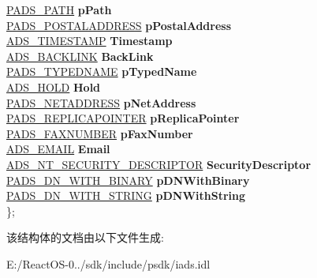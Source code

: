 \begin{DoxyCompactItemize}
\begin{tabbing}
\>\hyperlink{struct_a_d_s___p_a_t_h}{PADS\_PATH} {\bfseries pPath}\\
\>\hyperlink{struct_a_d_s___p_o_s_t_a_l_a_d_d_r_e_s_s}{PADS\_POSTALADDRESS} {\bfseries pPostalAddress}\\
\>\hyperlink{struct_a_d_s___t_i_m_e_s_t_a_m_p}{ADS\_TIMESTAMP} {\bfseries Timestamp}\\
\>\hyperlink{struct_a_d_s___b_a_c_k_l_i_n_k}{ADS\_BACKLINK} {\bfseries BackLink}\\
\>\hyperlink{struct_a_d_s___t_y_p_e_d_n_a_m_e}{PADS\_TYPEDNAME} {\bfseries pTypedName}\\
\>\hyperlink{struct_a_d_s___h_o_l_d}{ADS\_HOLD} {\bfseries Hold}\\
\>\hyperlink{struct_a_d_s___n_e_t_a_d_d_r_e_s_s}{PADS\_NETADDRESS} {\bfseries pNetAddress}\\
\>\hyperlink{struct_a_d_s___r_e_p_l_i_c_a_p_o_i_n_t_e_r}{PADS\_REPLICAPOINTER} {\bfseries pReplicaPointer}\\
\>\hyperlink{struct_a_d_s___f_a_x_n_u_m_b_e_r}{PADS\_FAXNUMBER} {\bfseries pFaxNumber}\\
\>\hyperlink{struct_a_d_s___e_m_a_i_l}{ADS\_EMAIL} {\bfseries Email}\\
\>\hyperlink{struct_a_d_s___n_t___s_e_c_u_r_i_t_y___d_e_s_c_r_i_p_t_o_r}{ADS\_NT\_SECURITY\_DESCRIPTOR} {\bfseries SecurityDescriptor}\\
\>\hyperlink{struct_a_d_s___d_n___w_i_t_h___b_i_n_a_r_y}{PADS\_DN\_WITH\_BINARY} {\bfseries pDNWithBinary}\\
\>\hyperlink{struct_a_d_s___d_n___w_i_t_h___s_t_r_i_n_g}{PADS\_DN\_WITH\_STRING} {\bfseries pDNWithString}\\
\}; \\

\end{tabbing}\end{DoxyCompactItemize}


该结构体的文档由以下文件生成\+:\begin{DoxyCompactItemize}
\item 
E\+:/\+React\+O\+S-\/0../sdk/include/psdk/iads.\+idl\end{DoxyCompactItemize}
